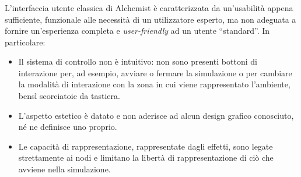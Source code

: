 \documentclass[%
]{beamer}
\newcommand{\engEmph}[1] {\emph{\foreignlanguage{english}#1}}
\begin{document}
    \begin{frame}
        \frametitle{\insertsection}
            \centering
    \end{frame}

    \begin{frame}
        \frametitle{\insertsection}

        L'interfaccia utente classica di Alchemist è caratterizzata da un'usabilità appena sufficiente, funzionale alle necessità di un utilizzatore esperto, ma non adeguata a fornire un'esperienza completa e \engEmph{user-friendly} ad un utente ``standard''.
        In particolare:

        \begin{itemize}[<+(1)->]
          \item
              Il sistema di controllo non è intuitivo: non sono presenti bottoni di interazione per, ad esempio, avviare o fermare la simulazione o per cambiare la modalità di interazione con la zona in cui viene rappresentato l'ambiente, bensì scorciatoie da tastiera.
          \item
              L'aspetto estetico è datato e non aderisce ad alcun design grafico conosciuto, né ne definisce uno proprio.
          \item
              Le capacità di rappresentazione, rappresentate dagli effetti, sono legate strettamente ai nodi e limitano la libertà di rappresentazione di ciò che avviene nella simulazione.
        \end{itemize}
    \end{frame}
\end{document}
